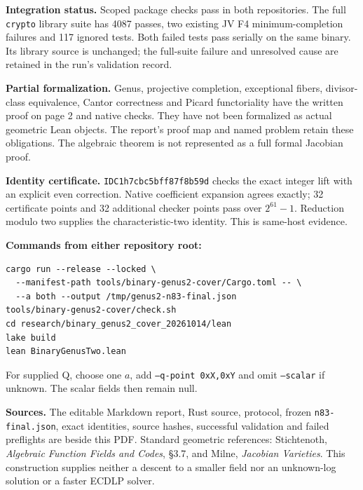 \documentclass[10pt]{article}
\begin{document}
\textbf{Integration status.} Scoped package checks pass in both repositories.
The full \texttt{crypto} library suite has 4087 passes, two existing JV F4
minimum-completion failures and 117 ignored tests. Both failed tests pass
serially on the same binary. Its library source is unchanged; the full-suite
failure and unresolved cause are retained in the run's validation record.

\textbf{Partial formalization.}
Genus, projective completion, exceptional fibers, divisor-class equivalence,
Cantor correctness and Picard functoriality have the written proof on page 2
and native checks. They have not been formalized as actual geometric Lean
objects. The report's proof map and named problem retain these obligations.
The algebraic theorem is not represented as a full formal Jacobian proof.

\textbf{Identity certificate.}
\texttt{IDC1h7cbc5bff87f8b59d} checks the exact integer lift with an explicit
even correction. Native coefficient expansion agrees exactly; 32 certificate
points and 32 additional checker points pass over $2^{61}-1$. Reduction modulo
two supplies the characteristic-two identity. This is same-host evidence.

\textbf{Commands from either repository root:}
\begin{verbatim}
cargo run --release --locked \
  --manifest-path tools/binary-genus2-cover/Cargo.toml -- \
  --a both --output /tmp/genus2-n83-final.json
tools/binary-genus2-cover/check.sh
cd research/binary_genus2_cover_20261014/lean
lake build
lean BinaryGenusTwo.lean
\end{verbatim}
For supplied Q, choose one $a$, add \texttt{--q-point 0xX,0xY} and omit
\texttt{--scalar} if unknown. The scalar fields then remain null.

\textbf{Sources.} The editable Markdown report, Rust source, protocol, frozen
\texttt{n83-final.json}, exact identities, source hashes, successful validation and
failed preflights are beside this PDF. Standard geometric references:
Stichtenoth, \emph{Algebraic Function Fields and Codes}, \S3.7, and Milne,
\emph{Jacobian Varieties}. This construction supplies neither a descent to a
smaller field nor an unknown-log solution or a faster ECDLP solver.
\end{document}
